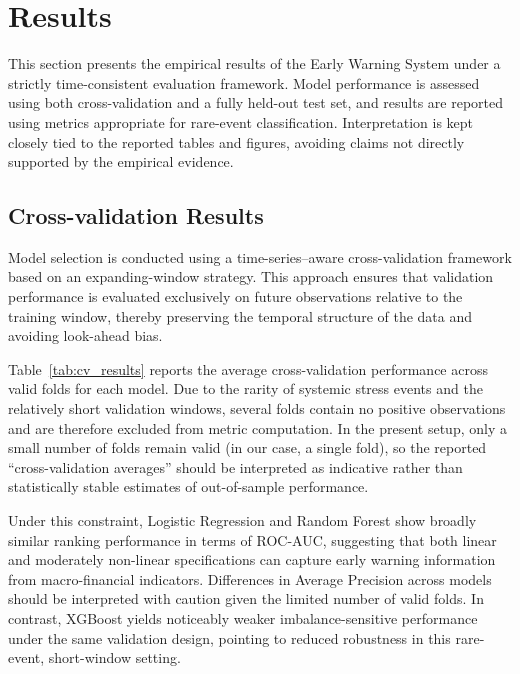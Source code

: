 \documentclass[11pt,a4paper]{article}
\begin{document}
\section{Results}
\label{sec:results}

This section presents the empirical results of the Early Warning System under a strictly time-consistent evaluation framework. Model performance is assessed using both cross-validation and a fully held-out test set, and results are reported using metrics appropriate for rare-event classification. Interpretation is kept closely tied to the reported tables and figures, avoiding claims not directly supported by the empirical evidence.

\subsection{Cross-validation Results}
\label{subsec:cv_results}

Model selection is conducted using a time-series--aware cross-validation framework based on an expanding-window strategy. This approach ensures that validation performance is evaluated exclusively on future observations relative to the training window, thereby preserving the temporal structure of the data and avoiding look-ahead bias.

Table~\ref{tab:cv_results} reports the average cross-validation performance across valid folds for each model. Due to the rarity of systemic stress events and the relatively short validation windows, several folds contain no positive observations and are therefore excluded from metric computation. In the present setup, only a small number of folds remain valid (in our case, a single fold), so the reported ``cross-validation averages'' should be interpreted as indicative rather than statistically stable estimates of out-of-sample performance.

Under this constraint, Logistic Regression and Random Forest show broadly similar ranking performance in terms of ROC-AUC, suggesting that both linear and moderately non-linear specifications can capture early warning information from macro-financial indicators. Differences in Average Precision across models should be interpreted with caution given the limited number of valid folds. In contrast, XGBoost yields noticeably weaker imbalance-sensitive performance under the same validation design, pointing to reduced robustness in this rare-event, short-window setting.
\end{document}

